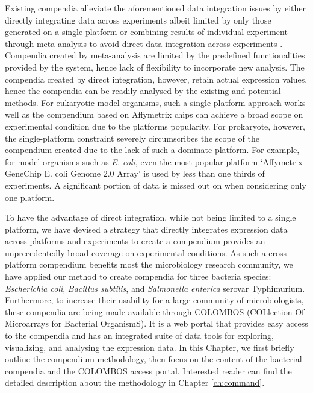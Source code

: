 Existing compendia alleviate the aforementioned data integration issues by  either directly integrating data across experiments albeit limited by only  those generated on a single-platform \cite{Faith2008, Hruz2008}  or combining results of individual experiment through meta-analysis to avoid  direct data integration across experiments  \cite{Rhodes2007, Pan2007, Elfilali2006, Kapushesky2010}. Compendia created by meta-analysis are limited by the predefined   functionalities provided by the system, hence lack of flexibility to  incorporate new analysis. The compendia created by direct integration, however, retain actual expression  values, hence the compendia can be readily analysed by the existing and  potential methods. For eukaryotic model organisms, such a single-platform approach works well  as the compendium based on Affymetrix chips can achieve a broad scope on  experimental condition due to the platforms popularity. For prokaryote, however, the single-platform constraint severely circumscribes  the scope of the compendium created due to the lack of such a dominate platform. For example, for model organisms such as {\it E. coli}, even the most popular  platform `Affymetrix GeneChip E. coli Genome 2.0 Array' is used by less than  one thirds of experiments. A significant portion of data is missed out on  when considering only one platform.

To have the advantage of direct integration, while not being limited to a  single platform, we have devised a strategy that directly integrates expression  data across platforms and experiments to create a compendium provides an  unprecedentedly broad coverage on experimental conditions. As such a cross-platform compendium benefits most the microbiology research  community, we have applied our method to create compendia for three  bacteria species: \textit{Escherichia coli}, \textit{Bacillus  subtilis}, and \textit{Salmonella enterica} serovar Typhimurium.   Furthermore, to increase their usability for a large community of  microbiologists, these compendia are being made available through COLOMBOS  (COLlection Of Microarrays for Bacterial OrganismS).  It is a web portal that provides easy access to the compendia and has an  integrated suite of data tools for exploring, visualizing, and analysing the  expression data. In this Chapter, we first briefly outline the compendium methodology, then  focus on the content of the bacterial compendia and the COLOMBOS access portal.  Interested reader can find the detailed description about the methodology in  Chapter \ref{ch:command}.



